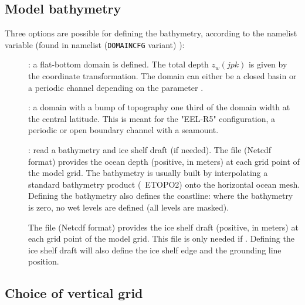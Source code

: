 \documentclass[../main/NEMO_manual]{subfiles}
\begin{document}
\subsection{Model bathymetry}
\label{subsec:DOMCFG_bathy}

Three options are possible for defining the bathymetry, according to the namelist variable
 (found in  namelist (\texttt{DOMAINCFG} variant) ):
\begin{description}
\item [{}]: a flat-bottom domain is defined.
  The total depth $z_w (jpk)$ is given by the coordinate transformation.
  The domain can either be a closed basin or a periodic channel depending on the parameter .
\item [{}]: a domain with a bump of topography one third of the domain width at the central latitude.
  This is meant for the "EEL-R5" configuration, a periodic or open boundary channel with a seamount.
\item [{}]: read a bathymetry and ice shelf draft (if needed).
  The  file (Netcdf format) provides the ocean depth (positive, in meters) at
  each grid point of the model grid.
  The bathymetry is usually built by interpolating a standard bathymetry product (\eg\ ETOPO2) onto
  the horizontal ocean mesh.
  Defining the bathymetry also defines the coastline: where the bathymetry is zero,
  no wet levels are defined (all levels are masked).

  The  file (Netcdf format) provides the ice shelf draft (positive, in meters) at
  each grid point of the model grid.
  This file is only needed if .
  Defining the ice shelf draft will also define the ice shelf edge and the grounding line position.
\end{description}

\subsection{Choice of vertical grid}
\label{sec:DOMCFG_vgrd}
\end{document}
